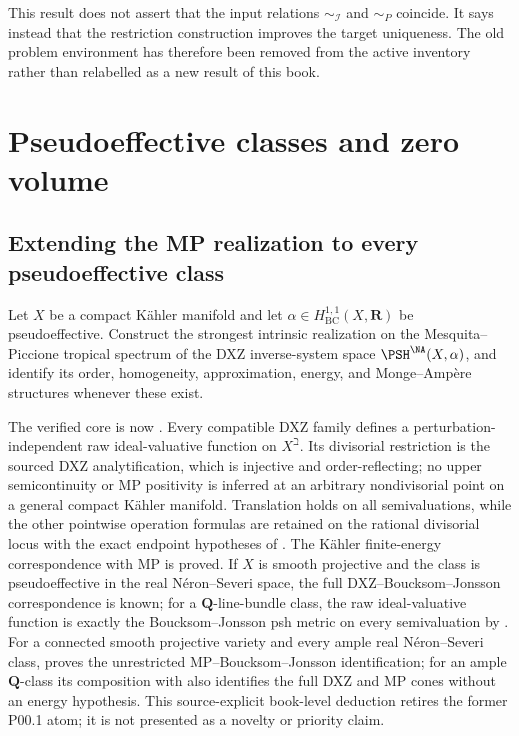 This result does not assert that the input relations
\(\sim_{\mathcal I}\) and \(\sim_P\) coincide.  It says instead that the
restriction construction improves the target uniqueness.  The old problem
environment has therefore been removed from the active inventory rather
than relabelled as a new result of this book.

\section{Pseudoeffective classes and zero volume}

\subsection{Extending the MP realization to every pseudoeffective class}

\begin{problem}\label{prob:frontier-mp-pseff}
Let \(X\) be a compact Kähler manifold and let
\(\alpha\in H^{1,1}_{\mathrm{BC}}(X,\mathbf R)\) be pseudoeffective.
Construct the strongest intrinsic realization on the Mesquita--Piccione
tropical spectrum of the DXZ inverse-system space
\(\PSH^{\NA}(X,\alpha)\), and identify its order, homogeneity,
approximation, energy, and Monge--Ampère structures whenever these exist.
\end{problem}

The verified core is now .  Every compatible DXZ
family defines a perturbation-independent raw ideal-valuative function on
\(X^\beth\).  Its divisorial restriction is the sourced DXZ
analytification, which is injective and order-reflecting; no upper
semicontinuity or MP positivity is inferred at an arbitrary nondivisorial
point on a general compact K\"ahler manifold.  Translation holds on all
semivaluations, while the other pointwise operation formulas are retained
on the rational divisorial locus with the exact endpoint hypotheses of
\cite{Xia23Operations}.  The K\"ahler finite-energy correspondence with MP
is proved.  If \(X\) is smooth projective and the class is pseudoeffective
in the real N\'eron--Severi space, the full DXZ--Boucksom--Jonsson
correspondence is known; for a \(\mathbf Q\)-line-bundle class, the raw
ideal-valuative function is exactly the Boucksom--Jonsson psh metric on
every semivaluation by \cite[formula~(3.8) and Theorem~3.12]{Xia23Operations}.
For a connected smooth projective variety and every ample real
N\'eron--Severi class,  proves the
unrestricted MP--Boucksom--Jonsson identification; for an ample
\(\mathbf Q\)-class its composition with \cite[Theorem~3.14]{DXZ23}
also identifies the full DXZ and MP cones without an energy hypothesis.
This source-explicit book-level deduction retires the former P00.1 atom;
it is not presented as a novelty or priority claim.

